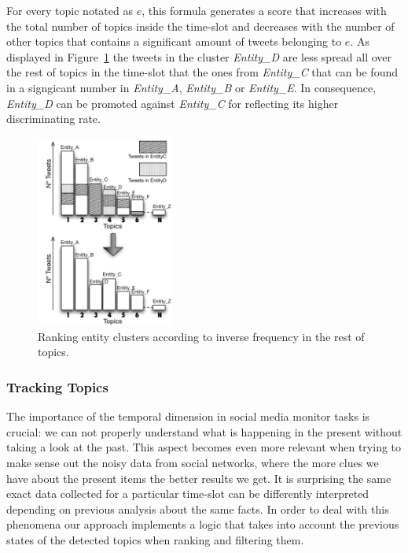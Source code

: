 \documentclass{sig-alternate}
\begin{document}
For every topic notated as $e$, this formula generates a score that increases with the total number of topics inside the time-slot and decreases with the number of other topics that contains a significant amount of tweets belonging to $e$. As displayed in Figure~\ref{fig:TF-IDF} the tweets in the cluster \textit{Entity\_D} are less spread all over the rest of topics in the time-slot that the ones from \textit{Entity\_C} that can be found in a signgicant number in \textit{Entity\_A},  \textit{Entity\_B} or  \textit{Entity\_E}. In consequence, \textit{Entity\_D} can be promoted against \textit{Entity\_C} for reflecting its higher discriminating rate.

\begin{figure}[h!]
\centering
\includegraphics[width=0.4\textwidth]{figure/TF-IDF.png}
\caption{Ranking entity clusters according to inverse frequency in the rest of topics.}
\label{fig:TF-IDF}
\end{figure}

\subsubsection{Tracking Topics}

The importance of the temporal dimension in social media monitor tasks is crucial: we can not properly understand what is happening in the present without taking a look at the past. This aspect becomes even more relevant when trying to make sense out the noisy data from social networks, where the more clues we have about the present items the better results we get. It is surprising the same exact data collected for a particular time-slot can be differently interpreted depending on previous analysis about the same facts. In order to deal with this phenomena our approach implements a logic that takes into account the previous states of the detected topics when ranking and filtering them. 
\end{document}
